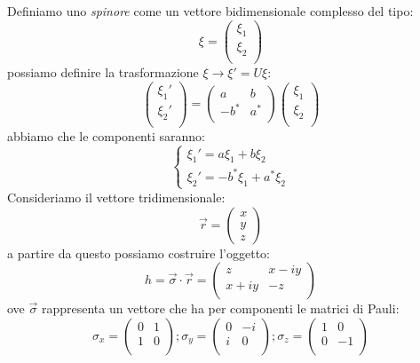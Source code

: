 Definiamo uno \textit{spinore} come un vettore bidimensionale complesso del tipo:
\begin{equation}
    \xi=\begin{pmatrix}
 \xi_1 \\
\xi_2\\
\end{pmatrix}
\end{equation}
possiamo definire la trasformazione $\xi\xrightarrow{}\xi'=U\xi$:
\begin{equation}
   \begin{pmatrix}
 \xi_1' \\
\xi_2'\\
\end{pmatrix}=\begin{pmatrix}
 a&b \\
-b^* &a^*\\
\end{pmatrix} \begin{pmatrix}
 \xi_1 \\
\xi_2\\
\end{pmatrix}
\end{equation}
abbiamo che le componenti saranno:
\begin{equation}
    \begin{cases}
        \xi_1'=a\xi_1+b\xi_2\\
        \xi_2'=-b^*\xi_1+a^*\xi_2
    \end{cases}
    \end{equation}
Consideriamo il vettore tridimensionale:
\begin{equation}
    \Vec{r}=\begin{pmatrix}
 x \\
y\\
z
\end{pmatrix}
\end{equation}
a partire da questo possiamo costruire l'oggetto:
\begin{equation}
   h=\Vec{\sigma}\cdot \Vec{r}=\begin{pmatrix}
 z &x-iy\\
x+iy&-z\\
\end{pmatrix}
\end{equation}
ove $\Vec{\sigma}$ rappresenta un vettore che ha per componenti le matrici di Pauli:
\begin{equation}
  \sigma_x=\begin{pmatrix}
 0 &1\\
1&0\\
\end{pmatrix}; \sigma_y=\begin{pmatrix}
 0&-i\\
i&0\\
\end{pmatrix}; \sigma_z=\begin{pmatrix}
 1&0\\
0&-1\\
\end{pmatrix}
\end{equation}
